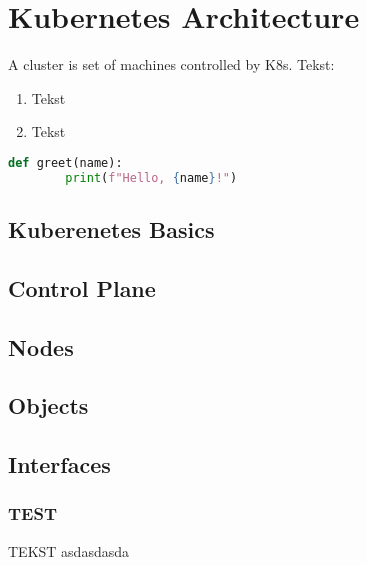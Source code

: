 \section{Kubernetes Architecture}
\label{sec:k8s_arch}
A cluster is set of machines controlled by K8s.
Tekst:
\begin{enumerate}%
\item Tekst

\item Tekst
\end{enumerate}


\begin{lstlisting}[language=Python, frame=single, caption={Python function to greet}]
    def greet(name):
        print(f"Hello, {name}!")
\end{lstlisting}


\subsection{Kuberenetes Basics}
\label{sec:k8s_basics}

\subsection{Control Plane}
\label{sec:k8s_cplane}

\subsection{Nodes}
\label{sec:k8s_nodes}

\subsection{Objects}    
\label{sec:k8s_objects}

\subsection{Interfaces}    
\label{sec:k8s_objects}

\subsubsection{TEST}
TEKST asdasdasda



